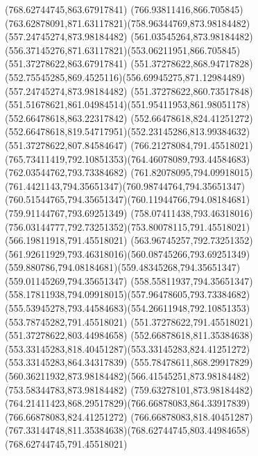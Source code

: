 {{\lineto(768.62744745,863.67917841)
\curveto(766.93811416,866.705845)(763.62878091,871.63117821)(758.96344769,873.98184482)
\closepath
\moveto(557.24745274,873.98184482)
\lineto(561.03545264,873.98184482)
\curveto(556.37145276,871.63117821)(553.06211951,866.705845)(551.37278622,863.67917841)
\lineto(551.37278622,868.94717828)
\curveto(552.75545285,869.4525116)(556.69945275,871.12984489)(557.24745274,873.98184482)
\moveto(551.37278622,860.73517848)
\curveto(551.51678621,861.04984514)(551.95411953,861.98051178)(552.66478618,863.22317842)
\lineto(552.66478618,824.41251272)
\curveto(552.66478618,819.54717951)(552.23145286,813.99384632)(551.37278622,807.84584647)
\closepath
\moveto(766.21278084,791.45518021)
\curveto(765.73411419,792.10851353)(764.46078089,793.44584683)(762.03544762,793.73384682)
\curveto(761.82078095,794.09918015)(761.4421143,794.35651347)(760.98744764,794.35651347)
\curveto(760.51544765,794.35651347)(760.11944766,794.08184681)(759.91144767,793.69251349)
\curveto(758.07411438,793.46318016)(756.03144777,792.73251352)(753.80078115,791.45518021)
\lineto(566.19811918,791.45518021)
\curveto(563.96745257,792.73251352)(561.92611929,793.46318016)(560.08745266,793.69251349)
\curveto(559.880786,794.08184681)(559.48345268,794.35651347)(559.01145269,794.35651347)
\curveto(558.55811937,794.35651347)(558.17811938,794.09918015)(557.96478605,793.73384682)
\curveto(555.53945278,793.44584683)(554.26611948,792.10851353)(553.78745282,791.45518021)
\lineto(551.37278622,791.45518021)
\lineto(551.37278622,803.44984658)
\curveto(552.66878618,811.35384638)(553.33145283,818.40451287)(553.33145283,824.41251272)
\lineto(553.33145283,864.34317839)
\curveto(555.78478611,868.29917829)(560.36211932,873.98184482)(566.41545251,873.98184482)
\lineto(753.58344783,873.98184482)
\curveto(759.63278101,873.98184482)(764.21411423,868.29517829)(766.66878083,864.33917839)
\lineto(766.66878083,824.41251272)
\curveto(766.66878083,818.40451287)(767.33144748,811.35384638)(768.62744745,803.44984658)
\lineto(768.62744745,791.45518021)
\closepath
}
}
{
}
